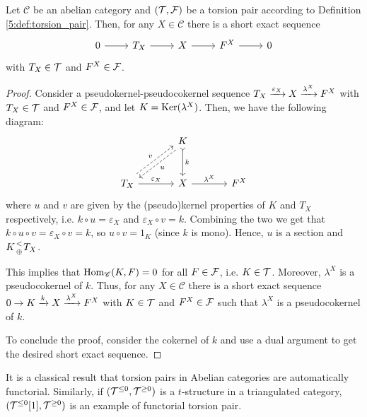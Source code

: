 \begin{lemma}
  Let $\mathscr{C}$ be an abelian category and $(\mathcal{T},\mathcal{F})$ be a torsion pair according to Definition \ref{5:def:torsion_pair}. Then, for any $X\in\mathscr{C}$ there is a short exact sequence
  \begin{equation*}
    \begin{tikzcd}
      0\arrow{r}&T_X\arrow{r}&X\arrow{r}&F^X\arrow{r}&0
    \end{tikzcd}
  \end{equation*}
  with $T_X\in\mathcal{T}$ and $F^X\in\mathcal{F}$.
\end{lemma}

\begin{proof}
  Consider a pseudokernel-pseudocokernel sequence $T_X\xrightarrow{\varepsilon_X} X\xrightarrow{\lambda^X} F^X$ with $T_X\in \mathcal{T}$ and $F^X\in\mathcal{F}$, and let $K=\operatorname{Ker}(\lambda^X)$. Then, we have the following diagram:
  \begin{equation*}
    \begin{tikzcd}[column sep=large,row sep=large]
      & K\arrow[tail]{d}{k}\arrow[dashed,shift left]{dl}{u}
        &\\
      T_X\arrow{r}{\varepsilon_X}\arrow[dashed,shift left]{ur}{v}
      & X\arrow{r}{\lambda^X}
        & F^X
    \end{tikzcd}
  \end{equation*}
  where $u$ and $v$ are given by the (pseudo)kernel properties of $K$ and $T_X$ respectively, i.e. $k\circ u=\varepsilon_X$ and $\varepsilon_X\circ v = k$. Combining the two we get that $k\circ u\circ v = \varepsilon_X\circ v = k$, so $u\circ v=1_K$ (since $k$ is mono). Hence, $u$ is a section and $K {< \atop \oplus} T_X$.

  This implies that $\operatorname{Hom}_\mathscr{C}(K,F)=0$ for all $F\in\mathcal{F}$, i.e. $K\in\mathcal{T}$. Moreover, $\lambda^X$ is a pseudocokernel of $k$. Thus, for any $X\in\mathscr{C}$ there is a short exact sequence $0\to K\xrightarrow{k} X\xrightarrow{\lambda^X} F^X$ with $K\in\mathcal{T}$ and $F^X\in\mathcal{F}$ such that $\lambda^X$ is a pseudocokernel of $k$.

  To conclude the proof, consider the cokernel of $k$ and use a dual argument to get the desired short exact sequence.
\end{proof}


It is a classical result that torsion pairs in Abelian categories are automatically functorial. Similarly, if $(\mathcal{T}^{\leq 0},\mathcal{T}^{\geq 0})$ is a $t$-structure in a triangulated category, $(\mathcal{T}^{\leq 0}[1],\mathcal{T}^{\geq 0})$ is an example of functorial torsion pair.


